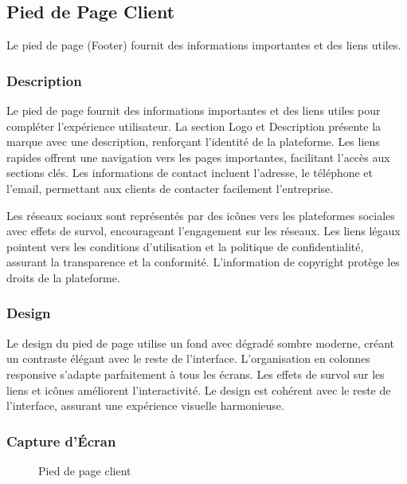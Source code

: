 \documentclass[12pt,a4paper]{article}
\begin{document}
\subsection{Pied de Page Client}

Le pied de page (Footer) fournit des informations importantes et des liens utiles.

\subsubsection{Description}

Le pied de page fournit des informations importantes et des liens utiles pour compléter l'expérience utilisateur. La section Logo et Description présente la marque avec une description, renforçant l'identité de la plateforme. Les liens rapides offrent une navigation vers les pages importantes, facilitant l'accès aux sections clés. Les informations de contact incluent l'adresse, le téléphone et l'email, permettant aux clients de contacter facilement l'entreprise.

Les réseaux sociaux sont représentés par des icônes vers les plateformes sociales avec effets de survol, encourageant l'engagement sur les réseaux. Les liens légaux pointent vers les conditions d'utilisation et la politique de confidentialité, assurant la transparence et la conformité. L'information de copyright protège les droits de la plateforme.

\subsubsection{Design}

Le design du pied de page utilise un fond avec dégradé sombre moderne, créant un contraste élégant avec le reste de l'interface. L'organisation en colonnes responsive s'adapte parfaitement à tous les écrans. Les effets de survol sur les liens et icônes améliorent l'interactivité. Le design est cohérent avec le reste de l'interface, assurant une expérience visuelle harmonieuse.

\subsubsection{Capture d'Écran}

\begin{figure}[H]
    \centering
    \caption{Pied de page client}
    \label{fig:footer}
\end{figure}
\end{document}
